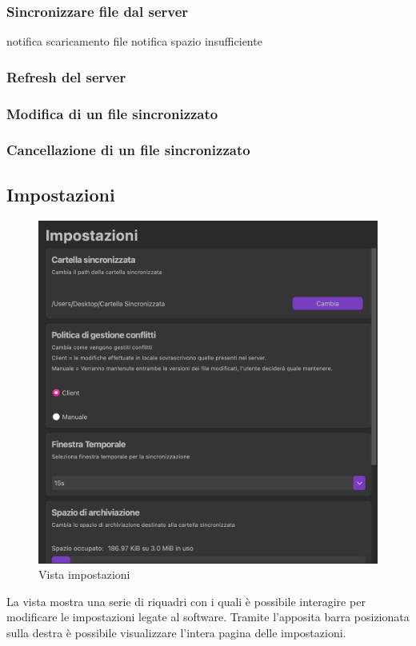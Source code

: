 \subsubsection*{Sincronizzare file dal server}
notifica scaricamento file \newline
notifica spazio insufficiente
\subsubsection*{Refresh del server}
\subsubsection*{Modifica di un file sincronizzato}
\subsubsection*{Cancellazione di un file sincronizzato}

\subsection{Impostazioni}
\label{sec:impostazioni}
\begin{figure}[H]
    \centering
    \includegraphics[scale = 0.7]{components/img/vistaImp.png}
    \caption{Vista impostazioni}
    \label{fig:impostazioni}
\end{figure}
La vista mostra una serie di riquadri con i quali è possibile interagire per modificare le impostazioni legate al software. Tramite l'apposita barra posizionata sulla destra è possibile visualizzare l'intera pagina delle impostazioni.

